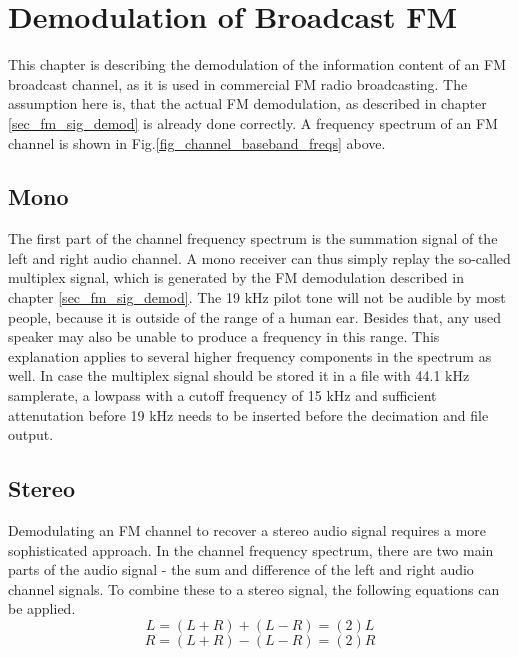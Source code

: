 \documentclass[conference]{IEEEtran}
\begin{document}
\section{Demodulation of Broadcast FM}
  This chapter is describing the demodulation of the information content of an FM broadcast channel, as it is used in commercial FM radio broadcasting.
  The assumption here is, that the actual FM demodulation, as described in chapter \ref{sec_fm_sig_demod} is already done correctly.
  A frequency spectrum of an FM channel is shown in Fig.\ref{fig_channel_baseband_freqs} above.

  \subsection{Mono}
  \label{demod_mono}
    The first part of the channel frequency spectrum is the summation signal of the left and right audio channel.
    A mono receiver can thus simply replay the so-called multiplex signal, which is generated by the FM demodulation described in chapter \ref{sec_fm_sig_demod}. The 19 kHz pilot tone will not be audible by most people, because it is outside of the range of a human ear. Besides that, any used speaker may also be unable to produce a frequency in this range. This explanation applies to several higher frequency components in the spectrum as well.
    In case the multiplex signal should be stored it in a file with 44.1 kHz samplerate, a lowpass with a cutoff frequency of 15 kHz and sufficient attenutation before 19 kHz needs to be inserted before the decimation and file output.

  \subsection{Stereo}
    Demodulating an FM channel to recover a stereo audio signal requires a more sophisticated approach.
    In the channel frequency spectrum, there are two main parts of the audio signal - the sum and difference of the left and right audio channel signals.
    To combine these to a stereo signal, the following equations can be applied.
    \begin{equation*}
      L = (L+R) + (L-R) = (2)L
    \end{equation*}
    \begin{equation}
      R = (L+R) - (L-R) = (2)R
      \label{equ_stereo_from_sum_diff}
    \end{equation}
\end{document}
